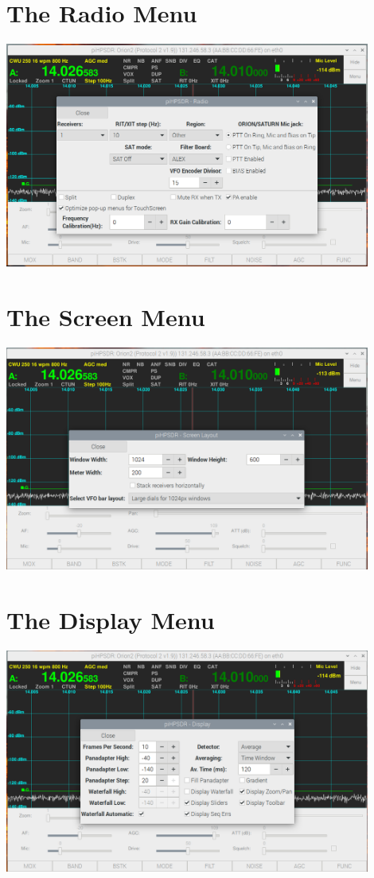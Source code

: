 \documentclass[12pt]{book}
\begin{document}
\section{The Radio Menu}
\begin{center}
\includegraphics[width=12cm]{RadioMenu.png}
\end{center}

\section{The Screen Menu}
\begin{center}
\includegraphics[width=12cm]{ScreenMenu.png}
\end{center}

\section{The Display Menu}
\begin{center}
\includegraphics[width=12cm]{DisplayMenu.png}
\end{center}
\end{document}
